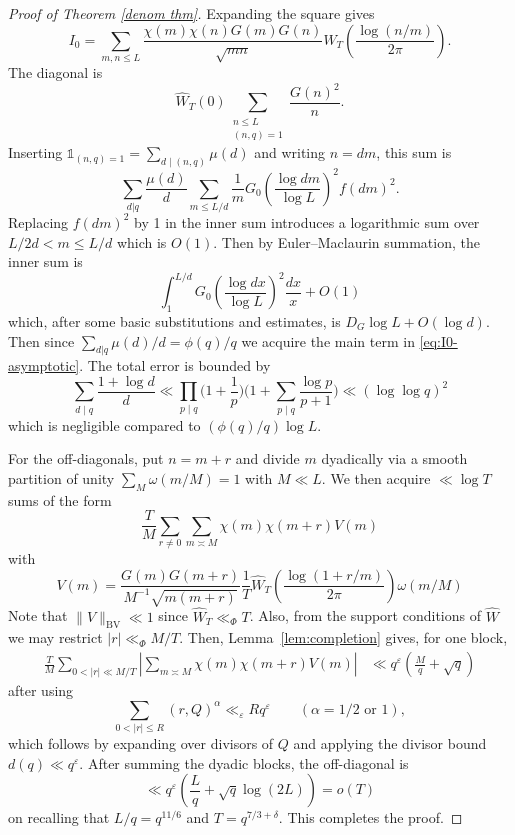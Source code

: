 \documentclass[12pt, oneside]{amsart}
\theoremstyle{definition}
\newcommand{\leqs}{\leqslant }
\newcommand{\wh}{\widehat}
\newcommand{\eps}{\varepsilon}
\newcommand{\1}{\mathds{1}}
\begin{document}
\begin{proof}[Proof of Theorem \ref{denom thm}]
Expanding the square gives
\begin{equation}
 I_0=\sum_{m,n\leqs L}\frac{\chi(m)\chi(n)G(m)G(n)}{\sqrt{mn}}
 \wh W_T\!\left(\frac{\log(n/m)}{2\pi}\right).
 \label{eq:I0-expand}
\end{equation}
The diagonal is
\[
 \wh W_T(0)\sum_{\substack{n\leqs L\\(n,q)=1}}
 \frac{G(n)^2}{n}.
\]
Inserting $\1_{(n,q)=1}=\sum_{d\mid(n,q)}\mu(d)$ and writing $n=dm$, this sum is
\[
\sum_{d|q}\frac{\mu(d)}{d}\sum_{m\leqs L/d} \frac1mG_0\!\left(\frac{\log dm}{\log L}\right)^2 f(dm)^2. 
\]
Replacing $f(dm)^2$ by 1 in the inner sum introduces a logarithmic sum over $L/2d<m\leqs L/d$ which is $O(1)$. Then by Euler--Maclaurin summation, the inner sum is 
\[
\int_1^{L/d}G_0\!\left(\frac{\log dx}{\log L}\right)^2\frac{dx}{x}+O(1)
\]
which, after some basic substitutions and estimates, is $D_G\log L+O(\log d)$. Then since $\sum_{d|q}\mu(d)/d=\phi(q)/q$ we acquire the main term in \eqref{eq:I0-asymptotic}.
The total error is bounded by
\[
 \sum_{d\mid q}\frac{1+\log d}{d}
 \ll \prod_{p\mid q}\bigg(1+\frac1p\bigg)
 \bigg(1+\sum_{p\mid q}\frac{\log p}{p+1}\bigg)
 \ll(\log\log q)^2
\]
which is negligible compared to $(\phi(q)/q)\log L$.

For the off-diagonals, put $n=m+r$ and divide $m$ dyadically via a smooth partition of unity $\sum_M \omega(m/M)=1$ with $M\ll L$. We then acquire $\ll \log T$ sums of the form 
\[
 \frac{T}{M}\sum_{r\neq 0}\sum_{m\asymp M}\chi(m)\chi(m+r)V(m)
\]
with 
\[
V(m)=\frac{G(m)G(m+r)}{M^{-1}\sqrt{m(m+r)}}\frac{1}{T}\wh W_T\!\left(\frac{\log(1+r/m)}{2\pi}\right)\omega(m/M)
\]
Note that $\|V\|_{\mathrm{BV}}\ll 1$ since $\wh W_T\ll_\Phi T$. Also, from the support
conditions of $\wh W$ we may restrict 
$|r|\ll_\Phi M/T$. Then, Lemma~\ref{lem:completion} gives, for one block,
\begin{align*}
 \frac{T}{M}\sum_{0<|r|\ll M/T}
 \left|\sum_{m\asymp M}\chi(m)\chi(m+r)V(m)\right|
 &\ll q^\eps\left(\frac Mq+\sqrt q\right)
\end{align*}
after using 
\begin{equation}
 \sum_{0<|r|\leqs R}(r,Q)^\alpha\ll_{\eps}Rq^\eps
 \qquad(\alpha=1/2\text{ or }1),
 \label{eq:gcd-average}
\end{equation}
which follows by expanding over divisors of $Q$ and applying the divisor bound $d(q)\ll q^\eps$.
After summing the dyadic blocks, the off-diagonal is
\begin{equation*}
 \ll q^\eps\left(\frac Lq+\sqrt q\log(2L)\right)=o(T)
 \label{eq:I0-off}
\end{equation*}
on recalling that $L/q=q^{11/6}$ and $T=q^{7/3+\delta}$.
  This completes the proof.
\end{proof}
\end{document}
